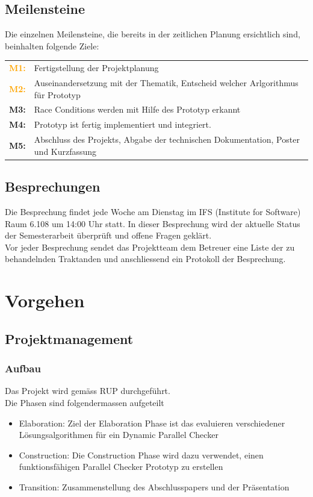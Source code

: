 \documentclass[10pt,a4paper]{article}
\begin{document}
\subsection{Meilensteine}
\begin{flushleft}
	Die einzelnen Meilensteine, die bereits in der zeitlichen Planung ersichtlich sind, beinhalten folgende Ziele:
\end{flushleft}
\begin{tabular}{cl}
	\textcolor{Orange}{\textbf{M1:}} & Fertigstellung der Projektplanung\\[0.2cm]
	\textcolor{Orange}{\textbf{M2:}} & Auseinandersetzung mit der Thematik, Entscheid welcher Arlgorithmus für Prototyp\\[0.2cm]
	\textcolor{NavyBlue}{\textbf{M3:}} & Race Conditions werden mit Hilfe des Prototyp erkannt\\[0.2cm]
	\textcolor{NavyBlue}{\textbf{M4:}} & Prototyp ist fertig implementiert und integriert.\\[0.2cm]
	\textcolor{Dandelion}{\textbf{M5:}} & Abschluss des Projekts, Abgabe der technischen Dokumentation, Poster und Kurzfassung\\
\end{tabular}
\subsection{Besprechungen}
\begin{flushleft}
	Die Besprechung findet jede Woche am Dienstag im IFS (Institute for Software) Raum 6.108 um 14:00 Uhr statt. In dieser Besprechung wird der aktuelle Status der Semesterarbeit überprüft und offene Fragen geklärt.\\
	Vor jeder Besprechung sendet das Projektteam dem Betreuer eine Liste der zu behandelnden Traktanden und anschliessend ein Protokoll der Besprechung.
\end{flushleft}
\newpage
\section{Vorgehen}
\subsection{Projektmanagement}
\subsubsection{Aufbau}
Das Projekt wird gemäss RUP durchgeführt.\\
Die Phasen sind folgendermassen aufgeteilt\\
\begin{itemize}
	\item Elaboration: Ziel der Elaboration Phase ist das evaluieren verschiedener Lösungsalgorithmen für ein Dynamic Parallel Checker
	\item Construction: Die Construction Phase wird dazu verwendet, einen funktionsfähigen Parallel Checker Prototyp zu erstellen
	\item Transition: Zusammenstellung des Abschlusspapers und der Präsentation
\end{itemize}
\end{document}
